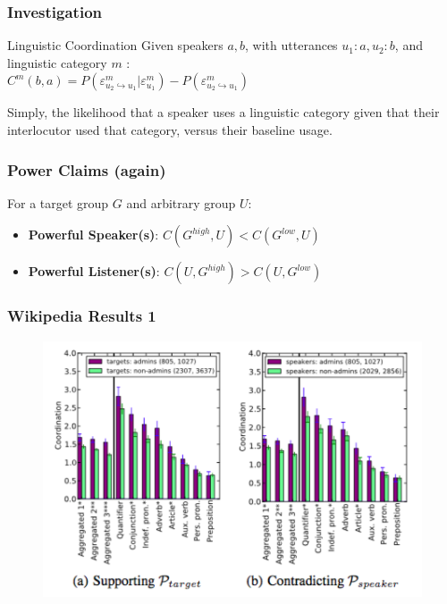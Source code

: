 \documentclass{beamer}
\begin{document}
\begin{frame}
\frametitle{Investigation}
\begin{block}{Linguistic Coordination}
Given speakers $a, b$, with utterances $u_1 : a, u_2 : b$, and linguistic category $m$ : \\
$C^m(b,a) = P(\varepsilon^{m}_{u_2 \hookrightarrow u_1}|\varepsilon^{m}_{u_1}) - P(\varepsilon^{m}_{u_2 \hookrightarrow u_1})$
\end{block}
Simply, the likelihood that a speaker uses a linguistic category given that their interlocutor used that category, versus their baseline usage.
\end{frame}
\begin{frame}
\frametitle{Power Claims (again)}
For a target group $G$ and arbitrary group $U$:\\
\begin{itemize}
	\item \textbf{Powerful Speaker(s)}: $C(G^{high}, U) < C(G^{low}, U)$
	\item \textbf{Powerful Listener(s)}: $C(U, G^{high}) > C(U, G^{low})$
\end{itemize}
\end{frame}
\begin{frame}
\frametitle{Wikipedia Results 1}
\begin{figure}
\includegraphics[width=0.8\linewidth]{wikiresults1.png}
\end{figure}
\end{frame}
\end{document}
